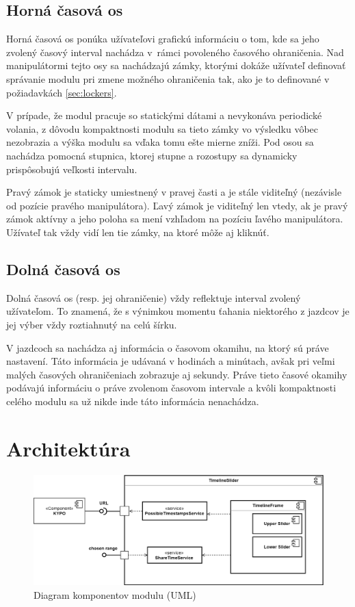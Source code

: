 \documentclass[
  digital, %
  twoside, %
  notable,   %
  nolof,   %
  nolot,   %
]{fithesis3}
\begin{document}
\subsection{Horná časová os}
Horná časová os ponúka užívateľovi grafickú informáciu o tom, kde sa jeho zvolený časový interval nachádza v~rámci povoleného časového ohraničenia. Nad manipulátormi tejto osy sa nachádzajú zámky, ktorými dokáže užívateľ definovať správanie modulu pri zmene možného ohraničenia tak, ako je to definované v požiadavkách \ref{sec:lockers}.

V prípade, že modul pracuje so statickými dátami a nevykonáva periodické volania, z dôvodu kompaktnosti modulu sa tieto zámky vo výsledku vôbec nezobrazia a výška modulu sa vďaka tomu ešte mierne zníži. Pod osou sa nachádza pomocná stupnica, ktorej stupne a rozostupy sa dynamicky prispôsobujú veľkosti intervalu.

Pravý zámok je staticky umiestnený v pravej časti a je stále viditeľný (nezávisle od pozície pravého manipulátora). Ľavý zámok je viditeľný len vtedy, ak je pravý zámok aktívny a jeho poloha sa mení vzhľadom na pozíciu ľavého manipulátora. Užívateľ tak vždy vidí len tie zámky, na ktoré môže aj kliknúť.

\subsection{Dolná časová os}
Dolná časová os (resp. jej ohraničenie) vždy reflektuje interval zvolený užívateľom. To znamená, že s výnimkou momentu ťahania niektorého z jazdcov je jej výber vždy roztiahnutý na celú šírku.

V jazdcoch sa nachádza aj informácia o časovom okamihu, na ktorý sú práve nastavení. Táto informácia je udávaná v hodinách a minútach, avšak pri veľmi malých časových ohraničeniach zobrazuje aj sekundy. Práve tieto časové okamihy podávajú informáciu o práve zvolenom časovom intervale a kvôli kompaktnosti celého modulu sa už nikde inde táto informácia nenachádza.

\section{Architektúra}
\begin{figure}[H]
	\center
	\includegraphics[width=1.0\linewidth]{component_diagram}
	\caption{Diagram komponentov modulu (UML)}
	\label{component_diagram}
\end{figure}
\end{document}
